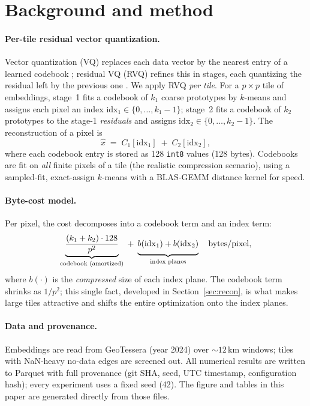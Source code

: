 \documentclass[11pt]{article}
\begin{document}
\section{Background and method}
\label{sec:method}

\paragraph{Per-tile residual vector quantization.}
Vector quantization (VQ) replaces each data vector by the nearest entry of a
learned codebook \cite{gray1984}; residual VQ (RVQ) refines this in stages, each
quantizing the residual left by the previous one \cite{jegou2011}. We apply RVQ
\emph{per tile}. For a $p\times p$ tile of embeddings, stage~1 fits a codebook of
$k_1$ coarse prototypes by $k$-means and assigns each pixel an index
$\mathrm{idx}_1\in\{0,\dots,k_1-1\}$; stage~2 fits a codebook of $k_2$ prototypes
to the stage-1 \emph{residuals} and assigns $\mathrm{idx}_2\in\{0,\dots,k_2-1\}$.
The reconstruction of a pixel is
\begin{equation}
\hat{x} \;=\; C_1[\mathrm{idx}_1] \;+\; C_2[\mathrm{idx}_2],
\end{equation}
where each codebook entry is stored as 128 \texttt{int8} values (128 bytes).
Codebooks are fit on \emph{all} finite pixels of a tile (the realistic
compression scenario), using a sampled-fit, exact-assign $k$-means with a
BLAS-GEMM distance kernel for speed.

\paragraph{Byte-cost model.}
Per pixel, the cost decomposes into a codebook term and an index term:
\begin{equation}
\underbrace{\frac{(k_1+k_2)\cdot 128}{p^2}}_{\text{codebook (amortized)}}
\;+\;
\underbrace{\vphantom{\frac{1}{1}} b(\mathrm{idx}_1) + b(\mathrm{idx}_2)}_{\text{index planes}}
\quad\text{bytes/pixel},
\label{eq:cost}
\end{equation}
where $b(\cdot)$ is the \emph{compressed} size of each index plane. The codebook
term shrinks as $1/p^2$; this single fact, developed in
Section~\ref{sec:recon}, is what makes large tiles attractive and shifts the
entire optimization onto the index planes.

\paragraph{Data and provenance.}
Embeddings are read from GeoTessera (year 2024) over ${\sim}12\,\mathrm{km}$
windows; tiles with NaN-heavy no-data edges are screened out. All numerical
results are written to Parquet with full provenance (git SHA, seed, UTC
timestamp, configuration hash); every experiment uses a fixed seed (42). The
figure and tables in this paper are generated directly from those files.
\end{document}
